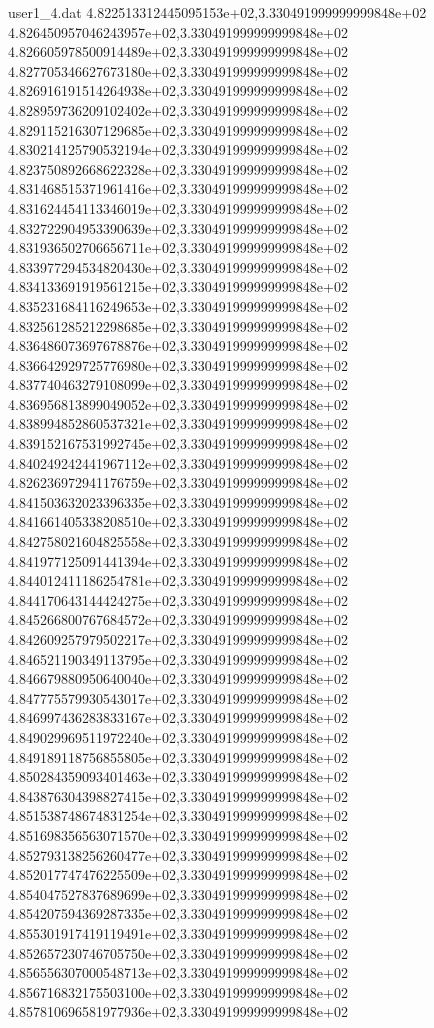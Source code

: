 \begin{filecontents}{user1_4.dat}
4.822513312445095153e+02,3.330491999999999848e+02
4.826450957046243957e+02,3.330491999999999848e+02
4.826605978500914489e+02,3.330491999999999848e+02
4.827705346627673180e+02,3.330491999999999848e+02
4.826916191514264938e+02,3.330491999999999848e+02
4.828959736209102402e+02,3.330491999999999848e+02
4.829115216307129685e+02,3.330491999999999848e+02
4.830214125790532194e+02,3.330491999999999848e+02
4.823750892668622328e+02,3.330491999999999848e+02
4.831468515371961416e+02,3.330491999999999848e+02
4.831624454113346019e+02,3.330491999999999848e+02
4.832722904953390639e+02,3.330491999999999848e+02
4.831936502706656711e+02,3.330491999999999848e+02
4.833977294534820430e+02,3.330491999999999848e+02
4.834133691919561215e+02,3.330491999999999848e+02
4.835231684116249653e+02,3.330491999999999848e+02
4.832561285212298685e+02,3.330491999999999848e+02
4.836486073697678876e+02,3.330491999999999848e+02
4.836642929725776980e+02,3.330491999999999848e+02
4.837740463279108099e+02,3.330491999999999848e+02
4.836956813899049052e+02,3.330491999999999848e+02
4.838994852860537321e+02,3.330491999999999848e+02
4.839152167531992745e+02,3.330491999999999848e+02
4.840249242441967112e+02,3.330491999999999848e+02
4.826236972941176759e+02,3.330491999999999848e+02
4.841503632023396335e+02,3.330491999999999848e+02
4.841661405338208510e+02,3.330491999999999848e+02
4.842758021604825558e+02,3.330491999999999848e+02
4.841977125091441394e+02,3.330491999999999848e+02
4.844012411186254781e+02,3.330491999999999848e+02
4.844170643144424275e+02,3.330491999999999848e+02
4.845266800767684572e+02,3.330491999999999848e+02
4.842609257979502217e+02,3.330491999999999848e+02
4.846521190349113795e+02,3.330491999999999848e+02
4.846679880950640040e+02,3.330491999999999848e+02
4.847775579930543017e+02,3.330491999999999848e+02
4.846997436283833167e+02,3.330491999999999848e+02
4.849029969511972240e+02,3.330491999999999848e+02
4.849189118756855805e+02,3.330491999999999848e+02
4.850284359093401463e+02,3.330491999999999848e+02
4.843876304398827415e+02,3.330491999999999848e+02
4.851538748674831254e+02,3.330491999999999848e+02
4.851698356563071570e+02,3.330491999999999848e+02
4.852793138256260477e+02,3.330491999999999848e+02
4.852017747476225509e+02,3.330491999999999848e+02
4.854047527837689699e+02,3.330491999999999848e+02
4.854207594369287335e+02,3.330491999999999848e+02
4.855301917419119491e+02,3.330491999999999848e+02
4.852657230746705750e+02,3.330491999999999848e+02
4.856556307000548713e+02,3.330491999999999848e+02
4.856716832175503100e+02,3.330491999999999848e+02
4.857810696581977936e+02,3.330491999999999848e+02

\end{filecontents}
